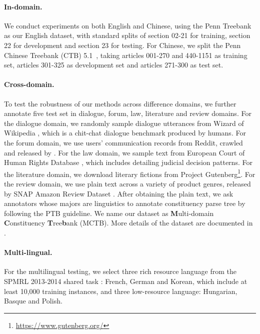 \documentclass[11pt]{article}
\begin{document}
\paragraph{In-domain.} We conduct experiments on both English and Chinese, using the Penn Treebank~\cite{ptb} as our English dataset, with standard splits of section 02-21 for training, section 22 for development and section 23 for testing. For Chinese, we split the Penn Chinese Treebank (CTB) 5.1~\cite{ctb}, taking articles 001-270 and 440-1151 as training set, articles 301-325 as development set and articles 271-300 as test set. 





\paragraph{Cross-domain.}
To test the robustness of our methods across difference domains, we further annotate five test set in dialogue, forum, law, literature and review domains. 
For the dialogue domain, we randomly sample dialogue utterances from Wizard of Wikipedia \cite{wizard}, which is a chit-chat dialogue benchmark produced by humans. 
For the forum domain, we use users' communication records from Reddit, crawled and released by \citet{voelske:2017}.
For the law domain, we sample text from European Court of Human Rights Database \cite{ECtHR}, which includes detailing judicial decision patterns. 
For the literature domain, we download literary fictions from Project Gutenberg\footnote{\url{https://www.gutenberg.org/}}. 
For the review domain, we use plain text across a variety of product genres, released by SNAP Amazon Review Dataset \cite{review}. After obtaining the plain text, we ask annotators whose majors are linguistics to annotate constituency parse tree by following the PTB guideline. 
We name our dataset as {\bf M}ulti-domain {\bf C}onstituency {\bf T}ree{\bf b}ank (MCTB).
More details of the dataset are documented in \citet{yang-etal-2022-challenge}.

\paragraph{Multi-lingual.} For the multilingual testing, we select three rich resource language from the SPMRL 2013-2014 shared task \cite{spmrl}: French, German and Korean, which include at least 10,000 training instances, and three low-resource language: Hungarian, Basque and Polish.
\end{document}
